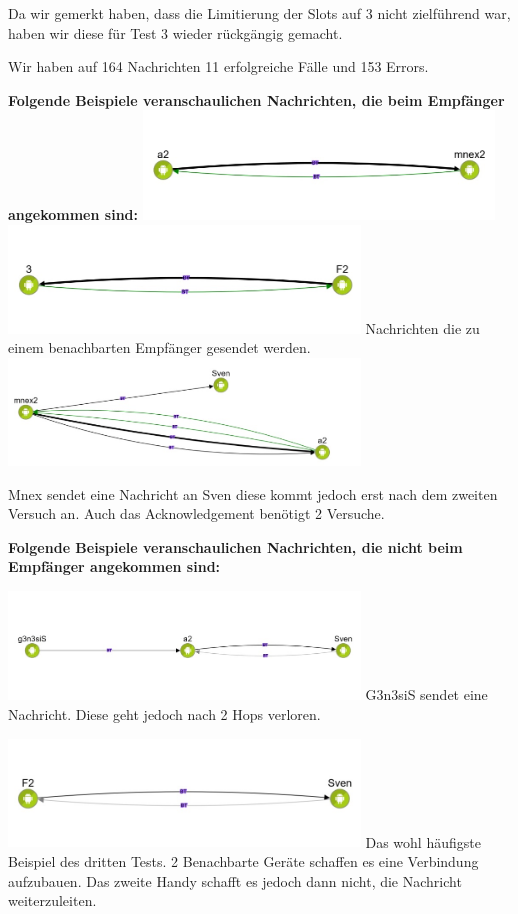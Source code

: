 Da wir gemerkt haben, dass die Limitierung der Slots auf 3 nicht
zielführend war, haben wir diese für Test 3 wieder rückgängig gemacht.

Wir haben auf 164 Nachrichten 11 erfolgreiche Fälle und 153 Errors.

\textbf{Folgende Beispiele veranschaulichen Nachrichten, die beim
Empfänger angekommen sind:}
\includegraphics[width=0.7\textwidth]{belege/grosstests/Bilder/Grosstest2/Test3Erfolg1.jpg}
\includegraphics[width=0.7\textwidth]{belege/grosstests/Bilder/Grosstest2/Test3Erfolg2.jpg}
Nachrichten die zu einem benachbarten Empfänger gesendet werden.
\includegraphics[width=0.7\textwidth]{belege/grosstests/Bilder/Grosstest2/Test3Erfolg3.jpg}

Mnex sendet eine Nachricht an Sven diese kommt jedoch erst nach dem
zweiten Versuch an. Auch das Acknowledgement benötigt 2 Versuche.

\textbf{Folgende Beispiele veranschaulichen Nachrichten, die nicht beim
Empfänger angekommen sind:}

\includegraphics[width=0.7\textwidth]{belege/grosstests/Bilder/Grosstest2/Test3Misserfolg1.jpg}
G3n3siS sendet eine Nachricht. Diese geht jedoch nach 2 Hops verloren.

\includegraphics[width=0.7\textwidth]{belege/grosstests/Bilder/Grosstest2/Test3Misserfolg2.jpg}
Das wohl häufigste Beispiel des dritten Tests. 2 Benachbarte Geräte
schaffen es eine Verbindung aufzubauen. Das zweite Handy schafft es
jedoch dann nicht, die Nachricht weiterzuleiten.

